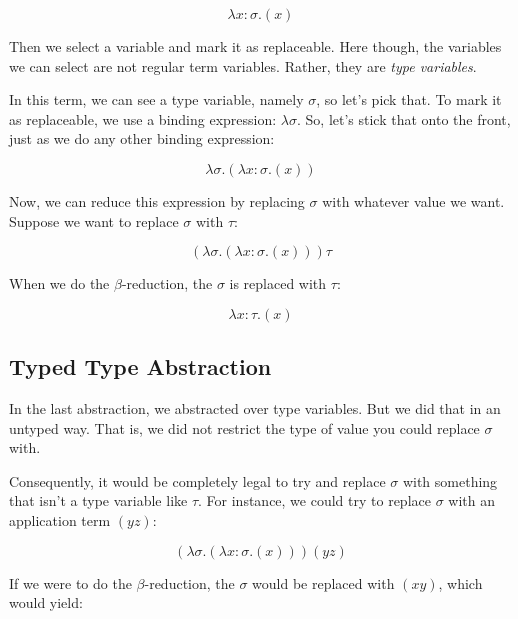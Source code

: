 \documentclass{book}
\numberwithin{equation}{chapter}
\begin{document}
\begin{equation}
\lambda x : \sigma.( x )
\end{equation}

\noindent
Then we select a variable and mark it as replaceable. Here though, the variables we can select are not regular term variables. Rather, they are \textit{type variables}. 

In this term, we can see a type variable, namely $\sigma$, so let's pick that. To mark it as replaceable, we use a binding expression: $\lambda \sigma$. So, let's stick that onto the front, just as we do any other binding expression:

\begin{equation}
\lambda \sigma.(\lambda x : \sigma.( x ))
\end{equation}

\noindent
Now, we can reduce this expression by replacing $\sigma$ with whatever value we want. Suppose we want to replace $\sigma$ with $\tau$:

\begin{equation}
(\lambda \sigma.(\lambda x : \sigma.( x ))) \tau
\end{equation}

\noindent
When we do the $\beta$-reduction, the $\sigma$ is replaced with $\tau$:

\begin{equation}
\lambda x : \tau.( x )
\end{equation}


\subsection{Typed Type Abstraction}

In the last abstraction, we abstracted over type variables. But we did that in an untyped way. That is, we did not restrict the type of value you could replace $\sigma$ with.

Consequently, it would be completely legal to try and replace $\sigma$ with something that isn't a type variable like $\tau$. For instance, we could try to replace $\sigma$ with an application term $(y z)$:

\begin{equation}
(\lambda \sigma.(\lambda x : \sigma.( x ))) (y z)
\end{equation}

\noindent
If we were to do the $\beta$-reduction, the $\sigma$ would be replaced with $(x y)$, which would yield:
\end{document}
